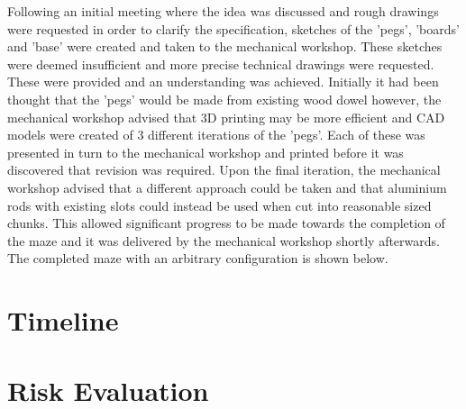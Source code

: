 Following an initial meeting where the idea was discussed and rough drawings were requested in order to clarify the specification, sketches of the 'pegs', 'boards' and 'base' were created and taken to the mechanical workshop. These sketches were deemed insufficient and more precise technical drawings were requested. These were provided and an understanding was achieved. 
	Initially it had been thought that the 'pegs' would be made from existing wood dowel however, the mechanical workshop advised that 3D printing may be more efficient and CAD models were created of 3 different iterations of the 'pegs'. Each of these was presented in turn to the mechanical workshop and printed before it was discovered that revision was required. Upon the final iteration, the mechanical workshop advised that a different approach could be taken and that aluminium rods with existing slots could instead be used when cut into reasonable sized chunks. This allowed significant progress to be made towards the completion of the maze and it was delivered by the mechanical workshop shortly afterwards. The completed maze with an arbitrary configuration is shown below.



\section{Timeline}\label{pm/timeline}



\section{Risk Evaluation}\label{pm/riskeval}
